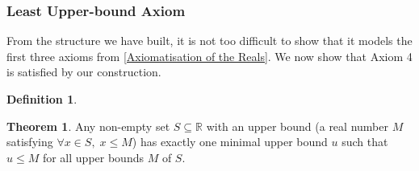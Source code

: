 \documentclass{article}
\theoremstyle{definition}
\newtheorem{thm}{Theorem}[subsubsection]
\newtheorem{defn}{Definition}[subsubsection]
\begin{document}
\subsubsection{Least Upper-bound Axiom}
From the structure we have built, it is not too difficult to show that it models the first three axioms from \ref{Axiomatisation of the Reals}. We now show that Axiom 4 is satisfied by our construction.
\begin{defn}
	
\end{defn}
\begin{thm}
	Any non-empty set $S\subseteq \mathbb{R}$ with an upper bound (a real number $M$ satisfying $\forall x\in S,\; x\leq M$) has exactly one minimal upper bound $u$ such that $u\leq M$ for all upper bounds $M$ of $S$.
\end{thm}
\end{document}
